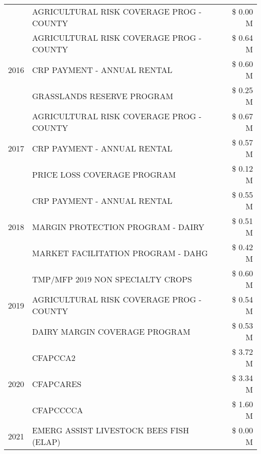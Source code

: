 \begin{tabular}{llr}
 & AGRICULTURAL RISK COVERAGE PROG - COUNTY & \$ 0.00 M \\
\cline{1-3}
\multirow[t]{3}{*}{2016} & AGRICULTURAL RISK COVERAGE PROG - COUNTY & \$ 0.64 M \\
 & CRP PAYMENT - ANNUAL RENTAL & \$ 0.60 M \\
 & GRASSLANDS RESERVE PROGRAM & \$ 0.25 M \\
\cline{1-3}
\multirow[t]{3}{*}{2017} & AGRICULTURAL RISK COVERAGE PROG - COUNTY & \$ 0.67 M \\
 & CRP PAYMENT - ANNUAL RENTAL & \$ 0.57 M \\
 & PRICE LOSS COVERAGE PROGRAM & \$ 0.12 M \\
\cline{1-3}
\multirow[t]{3}{*}{2018} & CRP PAYMENT - ANNUAL RENTAL & \$ 0.55 M \\
 & MARGIN PROTECTION PROGRAM - DAIRY & \$ 0.51 M \\
 & MARKET FACILITATION PROGRAM - DAHG & \$ 0.42 M \\
\cline{1-3}
\multirow[t]{3}{*}{2019} & TMP/MFP 2019 NON SPECIALTY CROPS & \$ 0.60 M \\
 & AGRICULTURAL RISK COVERAGE PROG - COUNTY & \$ 0.54 M \\
 & DAIRY MARGIN COVERAGE PROGRAM & \$ 0.53 M \\
\cline{1-3}
\multirow[t]{3}{*}{2020} & CFAPCCA2 & \$ 3.72 M \\
 & CFAPCARES & \$ 3.34 M \\
 & CFAPCCCCA & \$ 1.60 M \\
\cline{1-3}
2021 & EMERG ASSIST LIVESTOCK BEES FISH (ELAP) & \$ 0.00 M \\
\cline{1-3}
\bottomrule
\end{tabular}
